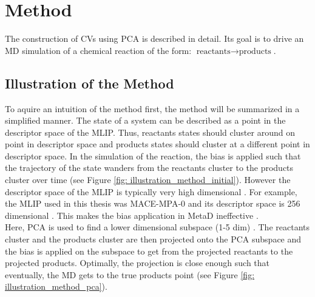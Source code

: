 \chapter{Method}\label{ch: ch3}%
The construction of CVs using PCA is described in detail.
Its goal is to drive an MD simulation of a chemical reaction of the form: $\text{reactants} \to \text{products}$.
\section{Illustration of the Method}
To aquire an intuition of the method first, the method will be summarized in a simplified manner. 
The state of a system can be described as a point in the descriptor space of the MLIP.
Thus, reactants states should cluster around on point in descriptor space and products states should cluster at a different point in descriptor space.
In the simulation of the reaction, the bias is applied such that the trajectory of the state wanders from the reactants cluster to the products cluster over time (see Figure \ref{fig: illustration_method_initial}). 
However the descriptor space of the MLIP  is typically very high dimensional \cite{Schaefer2025}. For example, the MLIP used in this thesis was MACE-MPA-0 and its descriptor space is 256 dimensional \cite{batatia2024foundation}.
This makes the bias application in MetaD ineffective \cite{Laio2008}. \\

Here, PCA is used to find a lower dimensional subspace (1-5 dim) \cite{Laio2008}. 
The reactants cluster and the products cluster are then projected onto the PCA subspace and the bias is applied on the subspace to get from the projected reactants to the projected products. 
Optimally, the projection is close enough such that eventually, the MD gets to the true products point (see Figure \ref{fig: illustration_method_pca}).

